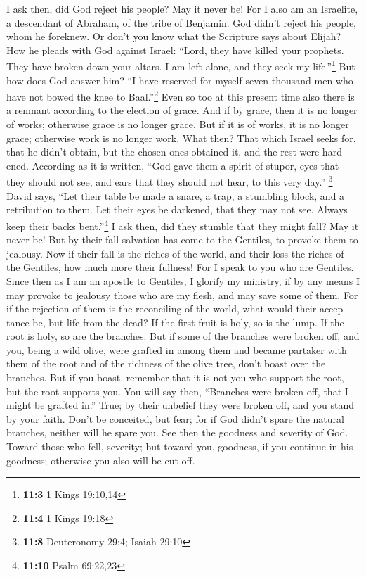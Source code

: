 \begin{paracol}{2}
\begin{otherlanguage}{english}
 I ask then, did God reject his people? May it never be!
For I also am an Israelite, a descendant of Abraham, of the tribe of
Benjamin.  God didn't reject his people, whom he foreknew.
Or don't you know what the Scripture says about Elijah? How he pleads
with God against Israel:  ``Lord, they have killed your
prophets. They have broken down your altars. I am left alone, and they
seek my life.''\footnote{\textbf{11:3} 1 Kings 19:10,14} 
But how does God answer him? ``I have reserved for myself seven thousand
men who have not bowed the knee to Baal.''\footnote{\textbf{11:4} 1
  Kings 19:18}  Even so too at this present time also
there is a remnant according to the election of grace. 
And if by grace, then it is no longer of works; otherwise grace is no
longer grace. But if it is of works, it is no longer grace; otherwise
work is no longer work.  What then? That which Israel
seeks for, that he didn't obtain, but the chosen ones obtained it, and
the rest were hardened.  According as it is written, ``God
gave them a spirit of stupor, eyes that they should not see, and ears
that they should not hear, to this very day.'' \footnote{\textbf{11:8}
  Deuteronomy 29:4; Isaiah 29:10}  David says, ``Let their
table be made a snare, a trap, a stumbling block, and a retribution to
them.  Let their eyes be darkened, that they may not see.
Always keep their backs bent.''\footnote{\textbf{11:10} Psalm 69:22,23}
 I ask then, did they stumble that they might fall? May
it never be! But by their fall salvation has come to the Gentiles, to
provoke them to jealousy.  Now if their fall is the
riches of the world, and their loss the riches of the Gentiles, how much
more their fullness!  For I speak to you who are
Gentiles. Since then as I am an apostle to Gentiles, I glorify my
ministry,  if by any means I may provoke to jealousy
those who are my flesh, and may save some of them.  For
if the rejection of them is the reconciling of the world, what would
their acceptance be, but life from the dead?  If the
first fruit is holy, so is the lump. If the root is holy, so are the
branches.  But if some of the branches were broken off,
and you, being a wild olive, were grafted in among them and became
partaker with them of the root and of the richness of the olive tree,
 don't boast over the branches. But if you boast,
remember that it is not you who support the root, but the root supports
you.  You will say then, ``Branches were broken off, that
I might be grafted in.''  True; by their unbelief they
were broken off, and you stand by your faith. Don't be conceited, but
fear;  for if God didn't spare the natural branches,
neither will he spare you.  See then the goodness and
severity of God. Toward those who fell, severity; but toward you,
goodness, if you continue in his goodness; otherwise you also will be
cut off.


\end{otherlanguage}
\end{paracol}
